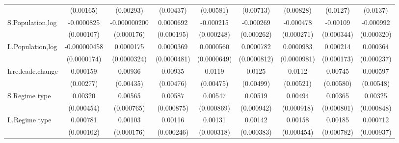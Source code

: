 \begin{table}[htbp]
\begin{tabular}{l*{8}{c}}
                    &   (0.00165)         &   (0.00293)         &   (0.00437)         &   (0.00581)         &   (0.00713)         &   (0.00828)         &    (0.0127)         &    (0.0137)         \\
[1em]
S.Population,log    &  -0.0000825         &-0.000000200         &   0.0000692         &   -0.000215         &   -0.000269         &   -0.000478\sym{*}  &    -0.00109\sym{***}&   -0.000992\sym{***}\\
                    &  (0.000107)         &  (0.000176)         &  (0.000195)         &  (0.000248)         &  (0.000262)         &  (0.000271)         &  (0.000344)         &  (0.000320)         \\
[1em]
L.Population,log    &-0.000000458         &   0.0000175         &   0.0000369         &   0.0000560         &   0.0000782         &   0.0000983         &    0.000214         &    0.000364         \\
                    & (0.0000174)         & (0.0000324)         & (0.0000481)         & (0.0000649)         & (0.0000812)         & (0.0000981)         &  (0.000173)         &  (0.000237)         \\
[1em]
Irre.leade.change   &    0.000159         &     0.00936\sym{**} &     0.00935\sym{*}  &      0.0119\sym{**} &      0.0125\sym{**} &      0.0112\sym{**} &     0.00745         &    0.000597         \\
                    &   (0.00277)         &   (0.00435)         &   (0.00476)         &   (0.00475)         &   (0.00499)         &   (0.00521)         &   (0.00580)         &   (0.00548)         \\
[1em]
S.Regime type       &     0.00320\sym{***}&     0.00565\sym{***}&     0.00587\sym{***}&     0.00547\sym{***}&     0.00519\sym{***}&     0.00494\sym{***}&     0.00365\sym{***}&     0.00325\sym{***}\\
                    &  (0.000454)         &  (0.000765)         &  (0.000875)         &  (0.000869)         &  (0.000942)         &  (0.000918)         &  (0.000801)         &  (0.000848)         \\
[1em]
L.Regime type       &    0.000781\sym{***}&     0.00103\sym{***}&     0.00116\sym{***}&     0.00131\sym{***}&     0.00142\sym{***}&     0.00158\sym{***}&     0.00185\sym{**} &    0.000712         \\
                    &  (0.000102)         &  (0.000176)         &  (0.000246)         &  (0.000318)         &  (0.000383)         &  (0.000454)         &  (0.000782)         &  (0.000937)         \\

\end{tabular}
\end{table}
